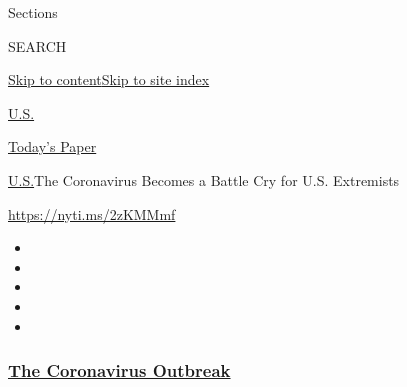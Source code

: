 Sections

SEARCH

\protect\hyperlink{site-content}{Skip to
content}\protect\hyperlink{site-index}{Skip to site index}

\href{https://www.nytimes3xbfgragh.onion/section/us}{U.S.}

\href{https://myaccount.nytimes3xbfgragh.onion/auth/login?response_type=cookie\&client_id=vi}{}

\href{https://www.nytimes3xbfgragh.onion/section/todayspaper}{Today's
Paper}

\href{/section/us}{U.S.}\textbar{}The Coronavirus Becomes a Battle Cry
for U.S. Extremists

\url{https://nyti.ms/2zKMMmf}

\begin{itemize}
\item
\item
\item
\item
\item
\end{itemize}

\hypertarget{the-coronavirus-outbreak}{%
\subsubsection{\texorpdfstring{\href{https://www.nytimes3xbfgragh.onion/news-event/coronavirus?name=styln-coronavirus-national\&region=TOP_BANNER\&block=storyline_menu_recirc\&action=click\&pgtype=Article\&impression_id=60dbe170-f4cc-11ea-a1cc-1b2d192d3c31\&variant=undefined}{The
Coronavirus
Outbreak}}{The Coronavirus Outbreak}}\label{the-coronavirus-outbreak}}

